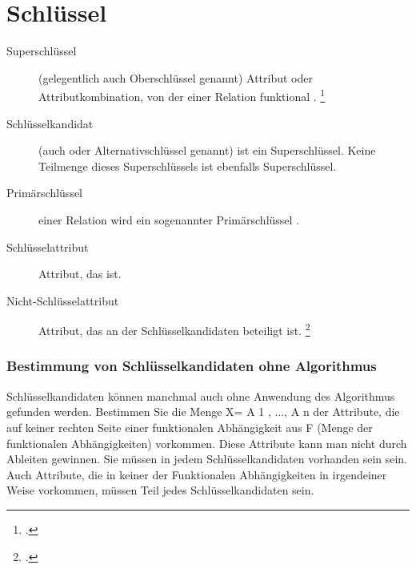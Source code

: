 \documentclass{lehramt-informatik-haupt}
\begin{document}
\let\ah=\liAttributHuelle
\let\m=\liAttributMenge

%

\chapter{Schlüssel}

\begin{description}
\item[Superschlüssel]

(gelegentlich auch Oberschlüssel genannt) Attribut oder
Attributkombination, von der  einer Relation
funktional .
\footcite[Seite 181 Kapitel 6.2 „Superschlüssel“]{kemper}

\item[Schlüsselkandidat]

(auch  oder Alternativschlüssel genannt) ist
ein  Superschlüssel. Keine Teilmenge dieses
Superschlüssels ist ebenfalls Superschlüssel.

\item[Primärschlüssel]

 einer Relation wird ein
sogenannter Primärschlüssel .

\item[Schlüsselattribut]

Attribut, das  ist.

\item[Nicht-Schlüsselattribut]

Attribut, das an  der Schlüsselkandidaten beteiligt ist.
\footcite[Seite 7]{db:fs:4}
\end{description}

%

\subsection{Bestimmung von Schlüsselkandidaten ohne Algorithmus}

Schlüsselkandidaten können manchmal auch ohne Anwendung des Algorithmus
gefunden werden. Bestimmen Sie die Menge X= {A 1 , ..., A n } der
Attribute, die auf keiner rechten Seite einer funktionalen Abhängigkeit
aus F (Menge der funktionalen Abhängigkeiten) vorkommen. Diese Attribute
kann man nicht durch Ableiten gewinnen. Sie müssen in jedem
Schlüsselkandidaten vorhanden sein sein. Auch Attribute, die in keiner
der Funktionalen Abhängigkeiten in irgendeiner Weise vorkommen, müssen
Teil jedes Schlüsselkandidaten sein.
\end{document}
